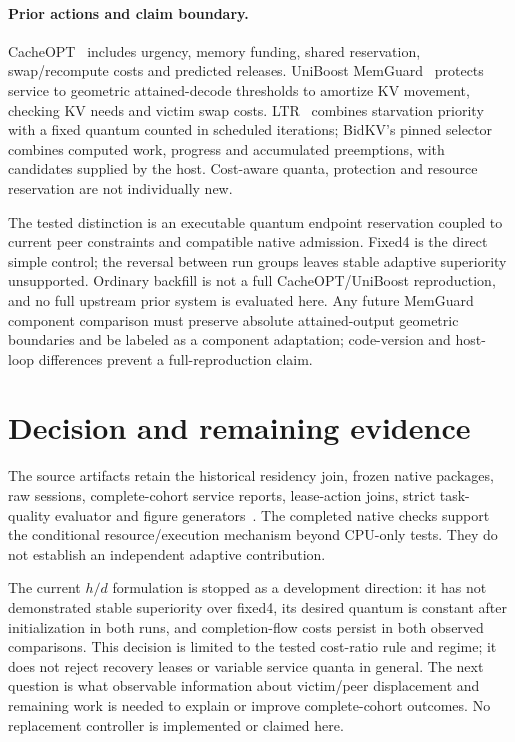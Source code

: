 \documentclass[10pt]{article}
\begin{document}
\paragraph{Prior actions and claim boundary.}
CacheOPT~\cite{cacheopt} includes urgency, memory funding, shared reservation, swap/recompute costs and predicted releases. UniBoost MemGuard~\cite{uniboost} protects service to geometric attained-decode thresholds to amortize KV movement, checking KV needs and victim swap costs. LTR~\cite{ltr} combines starvation priority with a fixed quantum counted in scheduled iterations; BidKV's pinned selector~\cite{bidkv} combines computed work, progress and accumulated preemptions, with candidates supplied by the host. Cost-aware quanta, protection and resource reservation are not individually new.

The tested distinction is an executable quantum endpoint reservation coupled to current peer constraints and compatible native admission. Fixed4 is the direct simple control; the reversal between run groups leaves stable adaptive superiority unsupported. Ordinary backfill is not a full CacheOPT/UniBoost reproduction, and no full upstream prior system is evaluated here. Any future MemGuard component comparison must preserve absolute attained-output geometric boundaries and be labeled as a component adaptation; code-version and host-loop differences prevent a full-reproduction claim.

\section{Decision and remaining evidence}
The source artifacts retain the historical residency join, frozen native packages, raw sessions, complete-cohort service reports, lease-action joins, strict task-quality evaluator and figure generators~\cite{local}. The completed native checks support the conditional resource/execution mechanism beyond CPU-only tests. They do not establish an independent adaptive contribution.

The current $h/d$ formulation is stopped as a development direction: it has not demonstrated stable superiority over fixed4, its desired quantum is constant after initialization in both runs, and completion-flow costs persist in both observed comparisons. This decision is limited to the tested cost-ratio rule and regime; it does not reject recovery leases or variable service quanta in general. The next question is what observable information about victim/peer displacement and remaining work is needed to explain or improve complete-cohort outcomes. No replacement controller is implemented or claimed here.
\end{document}
